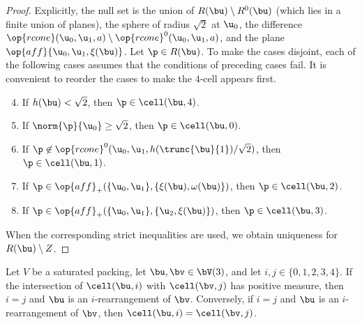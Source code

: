 \begin{proof} 
  Explicitly, the null set is the union of $R(\bu)\setminus R^0(\bu)$
  (which lies in a finite union of planes), the sphere of radius
  $\sqrt2$ at $\u_0$, the difference $\op{rcone}(\u_0,\u_1,a)\setminus
  \op{rcone}^0(\u_0,\u_1,a)$, and the plane
  $\op{aff}\{\u_0,\u_1,\xi(\bu)\}$.  Let $\p\in R(\bu)$.  To make the
  cases disjoint, each of the following cases assumes that the
  conditions of preceding cases fail.  It is convenient to reorder the
  cases to make the $4$-cell appears first.
\begin{enumerate}
\setcounter{enumi}{3}
\item %
If $h(\bu)<\sqrt2$,  then $\p\in\cell(\bu,4)$.

\setcounter{enumi}{-1}
\item %
If $\norm{\p}{\u_0} \ge\sqrt2$,  then $\p\in\cell(\bu,0)$.

\item
If $\p\not\in\op{rcone}^0(\u_0,\u_1,h(\trunc{\bu}{1})/\sqrt2)$, then
 $\p\in \cell(\bu,1)$.

\item
If $\p\in \op{aff}_+(\{\u_0,\u_1\},\{\xi(\bu),\omega(\bu)\})$, then
 $\p\in \cell(\bu,2)$.

\item If $\p\in \op{aff}_+(\{\u_0,\u_1\},\{\u_2,\xi(\bu)\})$, then
  $\p\in \cell(\bu,3)$.
\end{enumerate}
When the corresponding strict inequalities are used, we obtain
uniqueness for $R(\bu)\setminus Z$.
\end{proof}




\begin{lemma}[]\label{lemma:marchal-equal} 
Let $V$ be a saturated packing, 
let $\bu,\bv\in \bV(3)$, and let $i,j\in \{0,1,2,3,4\}$.
If the intersection of
$\cell(\bu,i)$ with $\cell(\bv,j)$ has positive measure,
then $i=j$ and $\bu$ is an $i$-rearrangement of $\bv$.
Conversely, if $i=j$ and $\bu$ is an $i$-rearrangement of $\bv$, 
then $\cell(\bu,i)=\cell(\bv,j)$.
\end{lemma}

